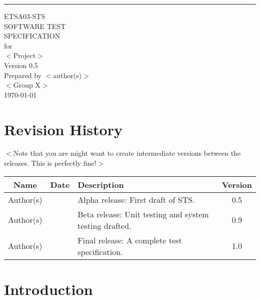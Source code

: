 \documentclass{scrreprt}
\def\myversion{0.5 }
\begin{document}
\begin{flushright}
    \rule{16cm}{5pt}\vskip1cm
    \begin{bfseries}
        \LARGE{ETSA03-STS}\\
        \Huge{SOFTWARE TEST\\ SPECIFICATION}\\
        \vspace{1.5cm}
        for\\
        $<$Project$>$\\
        \vspace{1.5cm}
        \LARGE{Version \myversion}\\
        \vspace{1.5cm}
        Prepared by $<$author(s)$>$\\
        \vspace{1.5cm}
        $<$Group X$>$\\
        \vspace{1.5cm}
        \today\\
    \end{bfseries}
\end{flushright}


\chapter*{Revision History}
$<$Note that you are might want to create intermediate versions between the releases. This is
perfectly fine!$>$

\begin{center}
    \begin{tabular}{|c|c|p{8cm}|c|}
        \hline
	    Name & Date & Description & Version\\
        \hline
	    Author(s) &  &  Alpha release: First draft of STS. & 0.5\\
        \hline
	    Author(s) &  & Beta release: Unit testing and system testing drafted. & 0.9\\
        \hline
        Author(s) &  & Final release: A complete test specification. & 1.0\\
        \hline
    \end{tabular}
\end{center}

\tableofcontents

\chapter{Introduction}
\end{document}
